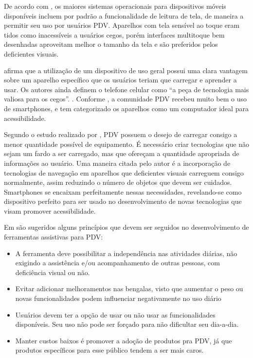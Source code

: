 \documentclass[twoside,english,brazilian]{UNISINOSartigo}
\begin{document}
De acordo com , os maiores sistemas operacionais para dispositivos móveis disponíveis incluem por padrão a funcionalidade de leitura de tela, de maneira a permitir seu uso por usuários PDV. Aparelhos com tela sensível ao toque eram tidos como inacessíveis a usuários cegos, porém interfaces multitoque bem desenhadas aproveitam melhor o tamanho da tela e são preferidos pelos deficientes visuais.

 afirma que a utilização de um dispositivo de uso geral possui uma clara vantagem sobre um aparelho específico que os usuários teriam que carregar e aprender a usar. Os autores ainda definem o telefone celular como “a peça de tecnologia mais valiosa para os cegos”. \cite{mau2008blindaid}. Conforme , a comunidade PDV recebeu muito bem o uso de smartphones, e tem categorizado os aparelhos como um computador ideal para acessibilidade.

Segundo o estudo realizado por , PDV possuem o desejo de carregar consigo a menor quantidade possível de equipamento. É necessário criar tecnologias que não sejam um fardo a ser carregado, mas que ofereçam a quantidade apropriada de informações ao usuário. Uma maneira citada pelo autor é a incorporação de tecnologias de navegação em aparelhos que deficientes visuais carreguem consigo normalmente, assim reduzindo o número de objetos que devem ser cuidados. Smartphones se encaixam perfeitamente nessas necessidades, revelando-se como dispositivo perfeito para ser usado no desenvolvimento de novas tecnologias que visam promover acessibilidade.

Em  são sugeridos alguns princípios que devem ser seguidos no desenvolvimento de ferramentas assistivas para PDV:
\begin{itemize}
	\item A ferramenta deve possibilitar a independência nas atividades diárias, não exigindo a assistência e/ou acompanhamento de outras pessoas, com deficiência visual ou não.
	\item Evitar adicionar melhoramentos nas bengalas, visto que aumentar o peso ou novas funcionalidades podem influenciar negativamente no uso diário
	\item Usuários devem ter a opção de usar ou não usar as funcionalidades disponíveis. Seu uso não pode ser forçado para não dificultar seu dia-a-dia.
	\item Manter custos baixos é promover a adoção de produtos pra PDV, já que produtos específicos para esse público tendem a ser mais caros.
\end{itemize}
\end{document}
